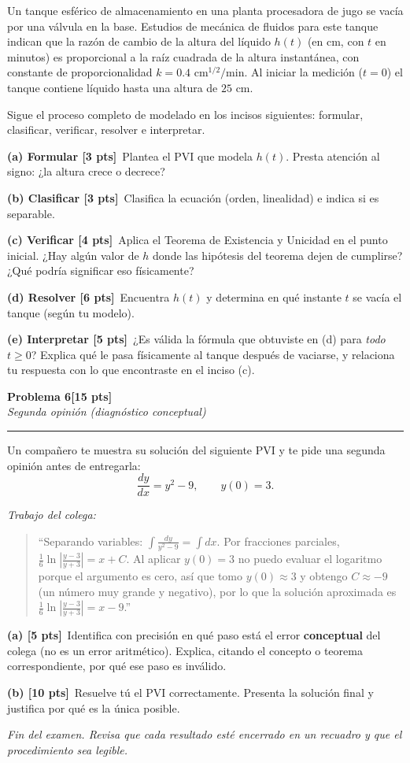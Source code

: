\documentclass[11pt,letterpaper]{article}
\newcommand{\problema}[3]{%
  \bigskip\bigskip\noindent
  {\Large\textbf{Problema #1}}\hfill\textbf{[#2 pts]}\\[3pt]
  {\small\itshape #3}\par
  \vspace{2pt}\hrule\vspace{8pt}
}
\newcommand{\subparte}[2]{%
  \medskip\noindent\textbf{(#1}\ #2\par
}
\begin{document}
Un tanque esférico de almacenamiento en una planta procesadora de jugo se vacía por una válvula en la base. Estudios de mecánica de fluidos para este tanque indican que la razón de cambio de la altura del líquido $h(t)$ (en cm, con $t$ en minutos) es proporcional a la raíz cuadrada de la altura instantánea, con constante de proporcionalidad $k = 0.4 \text{ cm}^{1/2}/\text{min}$. Al iniciar la medición ($t=0$) el tanque contiene líquido hasta una altura de $25$ cm.

Sigue el proceso completo de modelado en los incisos siguientes: formular, clasificar, verificar, resolver e interpretar.

\subparte{a) Formular [3 pts]}{Plantea el PVI que modela $h(t)$. Presta atención al signo: ¿la altura crece o decrece?}

\subparte{b) Clasificar [3 pts]}{Clasifica la ecuación (orden, linealidad) e indica si es separable.}

\subparte{c) Verificar [4 pts]}{Aplica el Teorema de Existencia y Unicidad en el punto inicial. ¿Hay algún valor de $h$ donde las hipótesis del teorema dejen de cumplirse? ¿Qué podría significar eso físicamente?}

\subparte{d) Resolver [6 pts]}{Encuentra $h(t)$ y determina en qué instante $t$ se vacía el tanque (según tu modelo).}

\subparte{e) Interpretar [5 pts]}{¿Es válida la fórmula que obtuviste en (d) para \emph{todo} $t \geq 0$? Explica qué le pasa físicamente al tanque después de vaciarse, y relaciona tu respuesta con lo que encontraste en el inciso (c).}


\problema{6}{15}{Segunda opinión (diagnóstico conceptual)}

Un compañero te muestra su solución del siguiente PVI y te pide una segunda opinión antes de entregarla:
\[
\frac{dy}{dx} = y^2 - 9, \qquad y(0) = 3.
\]

\textit{Trabajo del colega:}
\begin{quote}
\small
``Separando variables: $\displaystyle\int \frac{dy}{y^2-9} = \int dx$. Por fracciones parciales, $\displaystyle \frac{1}{6}\ln\left|\frac{y-3}{y+3}\right| = x + C$. Al aplicar $y(0)=3$ no puedo evaluar el logaritmo porque el argumento es cero, así que tomo $y(0) \approx 3$ y obtengo $C \approx -9$ (un número muy grande y negativo), por lo que la solución aproximada es $\displaystyle\frac{1}{6}\ln\left|\frac{y-3}{y+3}\right| = x - 9$.''
\end{quote}

\subparte{a) [5 pts]}{Identifica con precisión en qué paso está el error \textbf{conceptual} del colega (no es un error aritmético). Explica, citando el concepto o teorema correspondiente, por qué ese paso es inválido.}

\subparte{b) [10 pts]}{Resuelve tú el PVI correctamente. Presenta la solución final y justifica por qué es la única posible.}

\vfill
\begin{center}\small\textit{Fin del examen. Revisa que cada resultado esté encerrado en un recuadro y que el procedimiento sea legible.}\end{center}
\end{document}
